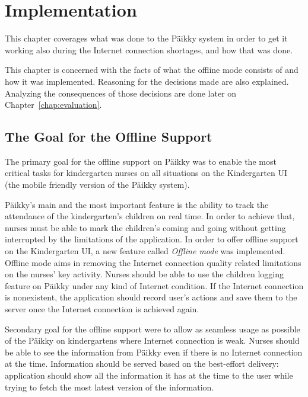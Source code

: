 
\chapter{Implementation}
This chapter coverages what was done to the Päikky system in order to get it working also during the Internet connection shortages, and how that was done. 

This chapter is concerned with the facts of what the offline mode consists of and how it was implemented. Reasoning for the decisions made are also explained. Analyzing the consequences of those decisions are done later on Chapter~\ref{chap:evaluation}.

\section{The Goal for the Offline Support}


The primary goal for the offline support on Päikky was to enable the most critical tasks for kindergarten nurses on all situations on the Kindergarten UI (the mobile friendly version of the Päikky system). 

Päikky's main and the most important feature is the ability to track the attendance of the kindergarten's children on real time. In order to achieve that, nurses must be able to mark the children's coming and going without getting interrupted by the limitations of the application. In order to offer offline support on the Kindergarten UI, a new feature called \textit{Offline mode} was implemented. Offline mode aims in removing the Internet connection quality related limitations on the nurses' key activity. Nurses should be able to use the children logging feature on Päikky under any kind of Internet condition. If the Internet connection is nonexistent, the application should record user's actions and save them to the server once the Internet connection is achieved again.

Secondary goal for the offline support were to allow as seamless usage as possible of the Päikky on kindergartens where Internet connection is weak. Nurses should be able to see the information from Päikky even if there is no Internet connection at the time. Information should be served based on the best-effort delivery: application should show all the information it has at the time to the user while trying to fetch the most latest version of the information.

